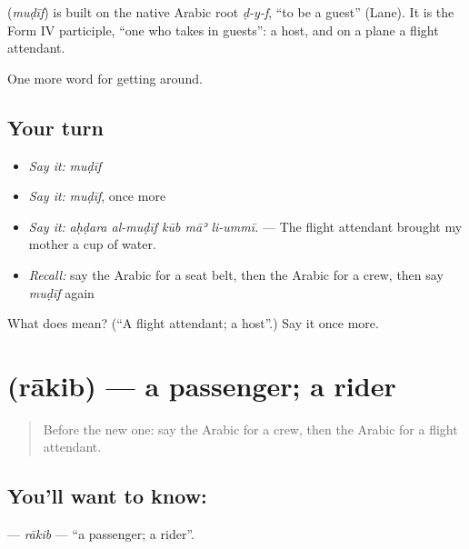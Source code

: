 \begin{cousinweb}
\textbf{} (\emph{muḍīf}) is built on the native Arabic root \emph{ḍ-y-f}, \textquotedblleft{}to be a guest\textquotedblright{} (Lane). It is the Form IV participle, \textquotedblleft{}one who takes in guests\textquotedblright{}: a host, and on a plane a flight attendant.
\end{cousinweb}

\begin{grammarlens}[title={What you've built}]
One more word for getting around.
\end{grammarlens}

\subsection*{Your turn}
\begin{itemize}
\raggedright
  \item \emph{Say it:} \emph{muḍīf}
  \item \emph{Say it:} \emph{muḍīf}, once more
  \item \emph{Say it:} \emph{aḥḍara al-muḍīf kūb māʾ li-ummī.} — The flight attendant brought my mother a cup of water.
  \item \emph{Recall:} say the Arabic for a seat belt, then the Arabic for a crew, then say \emph{muḍīf} again
\end{itemize}

\begin{tcolorbox}[breakable,colback=teal!4,colframe=teal!35!black,title={Before you move on}]
What does  mean? (\textquotedblleft{}A flight attendant; a host\textquotedblright{}.) Say it once more.
\end{tcolorbox}
\section[\texorpdfstring{\ar{راكب} (rākib)}{راكب (rākib)}]{ (rākib) — a passenger; a rider}

\label{lesson:AR-C425-rakib}



\begin{quote}
Before the new one: say the Arabic for a crew, then the Arabic for a flight attendant.
\end{quote}

\subsection*{You'll want to know: }
\textbf{} — \emph{rākib} — \textquotedblleft{}a passenger; a rider\textquotedblright{}.

